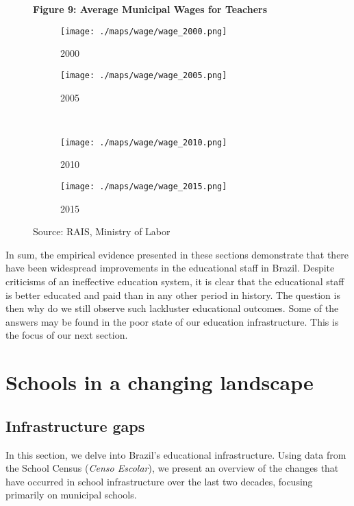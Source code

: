 \documentclass[12pt,]{book}
\begin{document}
\begin{figure}
    \centering
    \textbf{Figure 9: Average Municipal Wages for Teachers}
    \begin{subfigure}{0.4\textwidth}
        \centering 
        \texttt{[image: ./maps/wage/wage\_2000.png]}
        \caption{2000}
    \end{subfigure} %
    \begin{subfigure}{0.4\textwidth}
        \centering
        \texttt{[image: ./maps/wage/wage\_2005.png]}
        \caption{2005}
    \end{subfigure} \\
    \begin{subfigure}{0.4\textwidth}
        \centering
        \texttt{[image: ./maps/wage/wage\_2010.png]}
        \caption{2010}
    \end{subfigure} %
    \begin{subfigure}{0.4\textwidth}
        \centering
        \texttt{[image: ./maps/wage/wage\_2015.png]}
        \caption{2015}
    \end{subfigure}
    \caption*{\footnotesize \hfill Source: RAIS, Ministry of Labor}
\end{figure}

In sum, the empirical evidence presented in these sections demonstrate that there have been widespread improvements in the educational staff in Brazil. Despite criticisms of an ineffective education system, it is clear that the educational staff is better educated and paid than in any other period in history. The question is then why do we still observe such lackluster educational outcomes. Some of the answers may be found in the poor state of our education infrastructure. This is the focus of our next section.

\section{Schools in a changing landscape}

\subsection{Infrastructure gaps}

In this section, we delve into Brazil's educational infrastructure. Using data from the School Census (\emph{Censo Escolar}), we present an overview of the changes that have occurred in school infrastructure over the last two decades, focusing primarily on municipal schools.
\end{document}

